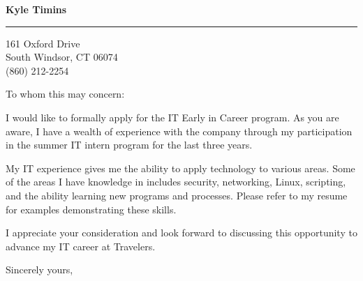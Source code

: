 \documentclass{letter} %
\begin{document}
\signature{Kyle Timins}            	   %
\longindentation=0pt                       %
\let\raggedleft\raggedright                %
 
 
\begin{letter}{}

\begin{center}
{\large\bf Kyle Timins} 
\end{center}
\medskip\hrule height 1pt
\begin{center}
{161 Oxford Drive \\   South Windsor, CT 06074 \\ (860) 212-2254} 
\end{center} \vspace{2 cm} %
 
 
\opening{To whom this may concern:} 

\noindent I would like to formally apply for the IT Early in Career
program. As you are aware, I have a wealth of experience with the 
company through my participation in the summer IT intern program 
for the last three years.

\noindent My IT experience gives me the ability to apply technology 
to various areas. Some of the areas I have knowledge in includes 
security, networking, Linux, scripting, and the ability learning new 
programs and processes. Please refer to my resume for examples 
demonstrating these skills.

\noindent I appreciate your consideration and look forward to discussing
this opportunity to advance my IT career at Travelers.
 
\closing{Sincerely yours,} 
 

 

\end{letter}

\vfill
\end{document}
